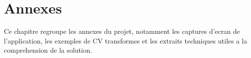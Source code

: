 \chapter{Annexes}
Ce chapitre regroupe les annexes du projet, notamment les captures d'ecran de l'application, les exemples de CV transformes et les extraits techniques utiles a la comprehension de la solution.